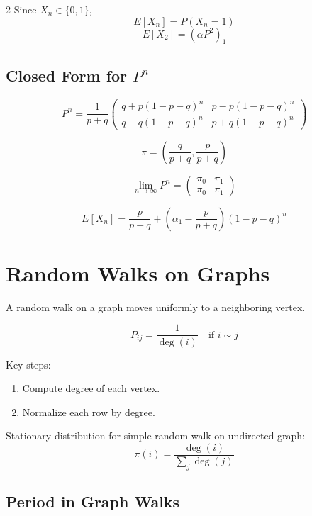 \documentclass[10pt]{article}
\begin{document}
\begin{multicols}{2}
Since \(X_n\in\{0,1\}\),
\[
E[X_n]=P(X_n=1)
\]
\[
E[X_2]=(\alpha P^2)_1
\]

\subsection{Closed Form for \(P^n\)}

\begin{formulabox}
\[
P^n=
\frac{1}{p+q}
\begin{pmatrix}
q+p(1-p-q)^n & p-p(1-p-q)^n\\
q-q(1-p-q)^n & p+q(1-p-q)^n
\end{pmatrix}
\]
\end{formulabox}

\[
\pi=
\left(\frac{q}{p+q},\frac{p}{p+q}\right)
\]

\[
\lim_{n\to\infty}P^n=
\begin{pmatrix}
\pi_0 & \pi_1\\
\pi_0 & \pi_1
\end{pmatrix}
\]

\begin{formulabox}
\[
E[X_n]
=
\frac{p}{p+q}
+
\left(\alpha_1-\frac{p}{p+q}\right)(1-p-q)^n
\]
\end{formulabox}

\section{Random Walks on Graphs}

\begin{definitionbox}
A random walk on a graph moves uniformly to a neighboring vertex.
\end{definitionbox}

\[
P_{ij}=
\frac{1}{\deg(i)}
\quad \text{if } i\sim j
\]

Key steps:
\begin{enumerate}[leftmargin=14pt,itemsep=1pt]
\item Compute degree of each vertex.
\item Normalize each row by degree.
\end{enumerate}

\begin{formulabox}
Stationary distribution for simple random walk on undirected graph:
\[
\pi(i)=\frac{\deg(i)}{\sum_j \deg(j)}
\]
\end{formulabox}

\subsection{Period in Graph Walks}


\end{multicols}
\end{document}
